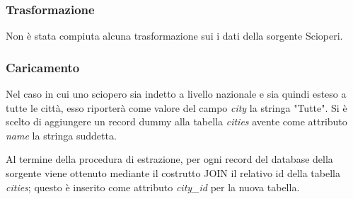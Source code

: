 \subsubsection{Trasformazione}

Non è stata compiuta alcuna trasformazione sui i dati della sorgente Scioperi.

\subsubsection{Caricamento}

Nel caso in cui uno sciopero sia indetto a livello nazionale e sia quindi esteso
a tutte le città, esso riporterà come valore del campo \textit{city} la stringa 
"Tutte". Si è scelto di aggiungere un record dummy alla tabella \textit{cities}
avente come attributo \textit{name} la stringa suddetta.

Al termine della procedura di estrazione, per ogni record del database della
sorgente viene ottenuto mediante il costrutto JOIN il relativo id della tabella
\textit{cities}; questo è inserito come attributo \textit{city\_id} per la
nuova tabella.

